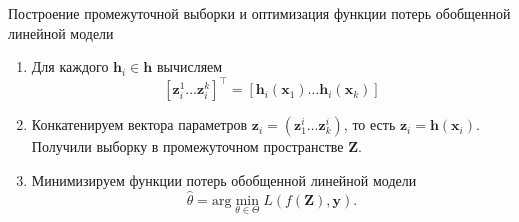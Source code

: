\documentclass{beamer}
\newcommand{\bz}{\mathbf{z}}
\newcommand{\bx}{\mathbf{x}}
\newcommand{\by}{\mathbf{y}}
\newcommand{\bh}{\mathbf{h}}
\newcommand{\bZ}{\mathbf{Z}}
\newcommand{\brs}[1]{\left(#1\right)}
\begin{document}
\begin{frame}{Построение промежуточной выборки и оптимизация функции потерь
              обобщенной линейной модели}
    \begin{enumerate}
        \item Для каждого $\bh_i \in \bh$ вычисляем
        $$
        [\bz_i^1 \ldots \bz_i^k]^\intercal = [\bh_i(\bx_1) \ldots \bh_i(\bx_k)]
        $$
        \item Конкатенируем вектора параметров $\bz_i = (\bz_1^i \ldots \bz_k^i)$,
        то есть $\bz_i = \bh(\bx_i)$. Получили выборку в промежуточном пространстве $\bZ$.
        \item Минимизируем функции потерь обобщенной линейной модели
        $$
        \hat{\mathbb{\theta}} = \mathrm{arg}\min_{\mathbb{\theta}\in \Theta} L\brs{f(\bZ), \by}.
        $$
    \end{enumerate}
\end{frame}

\end{document}
